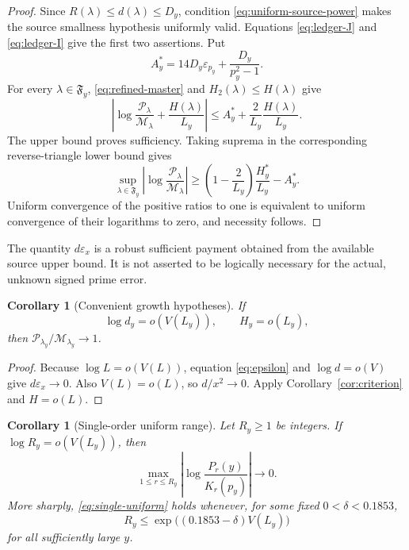\documentclass[11pt]{article}
\newtheorem{corollary}[theorem]{Corollary}
\theoremstyle{definition}
\theoremstyle{remark}
\newcommand{\eps}{\varepsilon}
\newcommand{\cP}{\mathcal P}
\newcommand{\cM}{\mathcal M}
\begin{document}
\begin{proof}
Since $R(\lambda)\le d(\lambda)\le D_y$, condition
\eqref{eq:uniform-source-power} makes the source smallness hypothesis
uniformly valid.  Equations \eqref{eq:ledger-J} and \eqref{eq:ledger-I}
give the first two assertions.  Put
\[
 A_y^*=14D_y\eps_{p_y}+\frac{D_y}{p_y^2-1}.
\]
For every $\lambda\in\mathfrak F_y$, \eqref{eq:refined-master} and
$H_2(\lambda)\le H(\lambda)$ give
\[
 \left|\log\frac{\cP_\lambda}{\cM_\lambda}+\frac{H(\lambda)}{L_y}\right|
 \le A_y^*+\frac2{L_y}\frac{H(\lambda)}{L_y}.
\]
The upper bound proves sufficiency.  Taking suprema in the corresponding
reverse-triangle lower bound gives
\[
 \sup_{\lambda\in\mathfrak F_y}
 \left|\log\frac{\cP_\lambda}{\cM_\lambda}\right|
 \ge\left(1-\frac2{L_y}\right)\frac{H_y^*}{L_y}-A_y^*.
\]
Uniform convergence of the positive ratios to one is equivalent to
uniform convergence of their logarithms to zero, and necessity follows.
\end{proof}

The quantity $d\eps_x$ is a robust sufficient payment obtained from the
available source upper bound.  It is not asserted to be logically
necessary for the actual, unknown signed prime error.

\begin{corollary}[Convenient growth hypotheses]
\label{cor:sufficient}
If
\begin{equation}
 \log d_y=o(V(L_y)),\qquad H_y=o(L_y),
 \label{eq:sufficient}
\end{equation}
then $\cP_{\lambda_y}/\cM_{\lambda_y}\to1$.
\end{corollary}

\begin{proof}
Because $\log L=o(V(L))$, equation \eqref{eq:epsilon} and
$\log d=o(V)$ give $d\eps_x\to0$.  Also $V(L)=o(L)$, so
$d/x^2\to0$.  Apply Corollary~\ref{cor:criterion} and $H=o(L)$.
\end{proof}

\begin{corollary}[Single-order uniform range]
\label{cor:single-r}
Let $R_y\ge1$ be integers.  If $\log R_y=o(V(L_y))$, then
\begin{equation}
 \max_{1\le r\le R_y}
 \left|\log\frac{P_r(y)}{K_r(p_y)}\right|\longrightarrow0.
 \label{eq:single-uniform}
\end{equation}
More sharply, \eqref{eq:single-uniform} holds whenever, for some fixed
$0<\delta<0.1853$,
\begin{equation}
 R_y\le\exp\bigl((0.1853-\delta)V(L_y)\bigr)
 \label{eq:delta-range}
\end{equation}
for all sufficiently large $y$.
\end{corollary}
\end{document}
